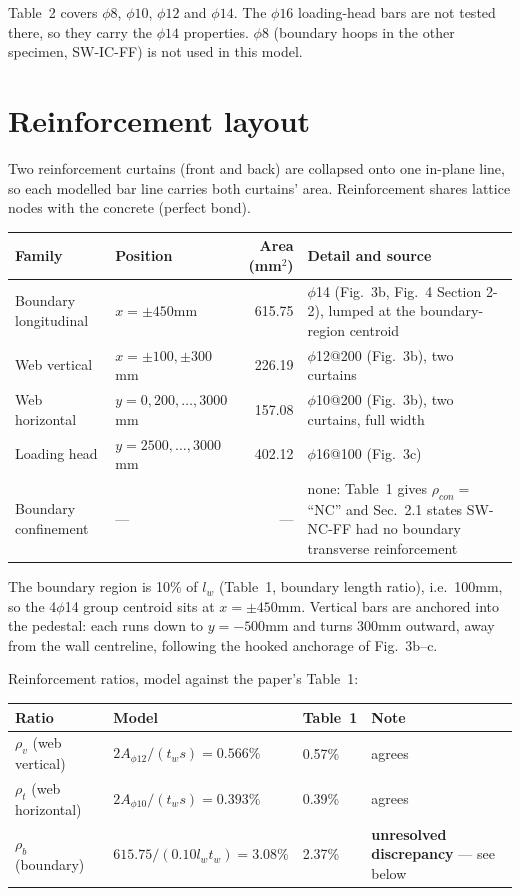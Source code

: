 \documentclass[11pt,a4paper]{article}
\begin{document}
Table~2 covers $\phi8$, $\phi10$, $\phi12$ and $\phi14$. The $\phi16$ loading-head bars are not
tested there, so they carry the $\phi14$ properties. $\phi8$ (boundary hoops in the other specimen,
SW-IC-FF) is not used in this model.

\section{Reinforcement layout}

Two reinforcement curtains (front and back) are collapsed onto one in-plane line, so each modelled
bar line carries both curtains' area. Reinforcement shares lattice nodes with the concrete
(perfect bond).

\begin{tabularx}{\textwidth}{@{}p{30mm}p{36mm}r>{\raggedright\arraybackslash}X@{}}
\toprule
\textbf{Family} & \textbf{Position} & \textbf{Area (mm$^2$)} & \textbf{Detail and source} \\
\midrule
Boundary longitudinal & $x = \pm450$\unit{mm} & 615.75 & 4$\phi$14 (Fig.~3b, Fig.~4 Section 2-2), lumped at the boundary-region centroid \\
Web vertical          & $x = \pm100, \pm300$\unit{mm} & 226.19 & $\phi$12@200 (Fig.~3b), two curtains \\
Web horizontal        & $y = 0, 200, \dots, 3000$\unit{mm} & 157.08 & $\phi$10@200 (Fig.~3b), two curtains, full width \\
Loading head          & $y = 2500, \dots, 3000$\unit{mm} & 402.12 & $\phi$16@100 (Fig.~3c) \\
Boundary confinement  & --- & --- & none: Table~1 gives $\rho_{con} =$ ``NC'' and Sec.~2.1 states SW-NC-FF had no boundary transverse reinforcement \\
\bottomrule
\end{tabularx}

The boundary region is 10\% of $l_w$ (Table~1, boundary length ratio), i.e.\ 100\unit{mm}, so the
4$\phi$14 group centroid sits at $x = \pm450$\unit{mm}. Vertical bars are anchored into the
pedestal: each runs down to $y = -500$\unit{mm} and turns $300$\unit{mm} outward, away from the
wall centreline, following the hooked anchorage of Fig.~3b--c.

Reinforcement ratios, model against the paper's Table~1:

\begin{tabularx}{\textwidth}{@{}p{30mm}p{40mm}p{20mm}>{\raggedright\arraybackslash}X@{}}
\toprule
\textbf{Ratio} & \textbf{Model} & \textbf{Table~1} & \textbf{Note} \\
\midrule
$\rho_v$ (web vertical)   & $2A_{\phi12}/(t_w s) = 0.566\%$ & 0.57\% & agrees \\
$\rho_t$ (web horizontal) & $2A_{\phi10}/(t_w s) = 0.393\%$ & 0.39\% & agrees \\
$\rho_b$ (boundary)       & $615.75/(0.10 l_w t_w) = 3.08\%$ & 2.37\% & \textbf{unresolved discrepancy}
--- see below \\
\bottomrule
\end{tabularx}
\end{document}
